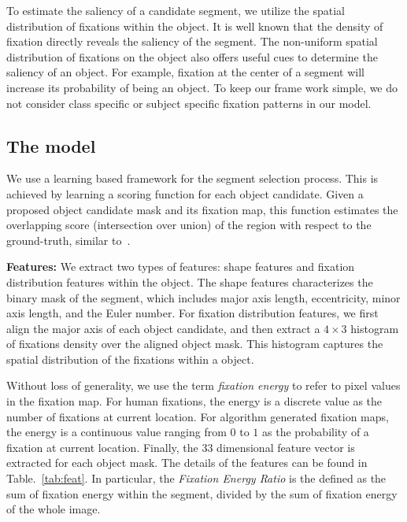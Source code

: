 To estimate the saliency of a candidate segment, we utilize the spatial distribution of fixations within the object.  It is well known that the density of fixation directly reveals the saliency of the segment.  The non-uniform spatial distribution of fixations on the object also offers useful cues to determine the saliency of an object. For example, fixation at the center of a segment will increase its probability of being an object.  To keep our frame work simple, we do not consider class specific or subject specific fixation patterns in our model.

\subsection{The model}
We use a learning based framework for the segment selection process. This is achieved by learning a scoring function for each object candidate. Given a proposed object candidate mask and its fixation map, this function estimates the overlapping score (intersection over union) of the region with respect to the ground-truth, similar to~\cite{li2010object}.

\textbf{Features:} We extract two types of features: shape features and fixation distribution features within the object. The shape features characterizes the binary mask of the segment, which includes major axis length, eccentricity, minor axis length, and the Euler number. For fixation distribution features, we first align the major axis of each object candidate, and then extract a $4\times3$ histogram of fixations density over the aligned object mask. This histogram captures the spatial distribution of the fixations within a object.

Without loss of generality, we use the term {\it fixation energy} to refer to pixel values in the fixation map. For human fixations, the energy is a discrete value as the number of fixations at current location. For algorithm generated fixation maps, the energy is a continuous value ranging from $0$ to $1$ as the probability of a fixation at current location. Finally, the $33$ dimensional feature vector is extracted for each object mask. The details of the features can be found in Table.~\ref{tab:feat}.  In particular, the {\it Fixation Energy Ratio} is the defined as the sum of fixation energy within the segment, divided by the sum of fixation energy of the whole image.

